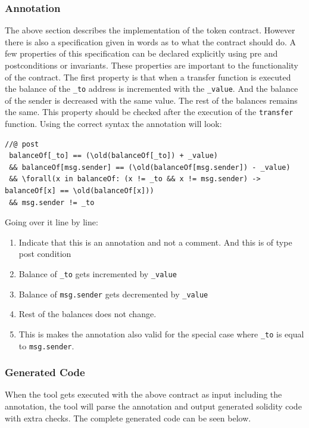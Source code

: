 \documentclass[a4paper]{article}
\begin{document}
\subsubsection{Annotation}
The above section describes the implementation of the token contract. However there is also a specification given in words as to what the contract should do. A few properties of this specification can be declared explicitly using pre and postconditions or invariants. These properties are important to the functionality of the contract. 
The first property is that when a transfer function is executed the balance of the \texttt{\_to} address is incremented with the \texttt{\_value}. And the balance of the sender is decreased with the same value. The rest of the balances remains the same. This property should be checked after the execution of the \texttt{transfer} function. Using the correct syntax the annotation will look:
\begin{lstlisting}[basicstyle=\ttfamily, breaklines=true ]
//@ post 
 balanceOf[_to] == (\old(balanceOf[_to]) + _value) 
 && balanceOf[msg.sender] == (\old(balanceOf[msg.sender]) - _value) 
 && \forall(x in balanceOf: (x != _to && x != msg.sender) -> balanceOf[x] == \old(balanceOf[x])) 
 && msg.sender != _to 
\end{lstlisting}
Going over it line by line:
\begin{enumerate}
  \item Indicate that this is an annotation and not a comment. And this is of type post condition
  \item Balance of \texttt{\_to} gets incremented by \texttt{\_value}
  \item Balance of \texttt{msg.sender} gets decremented by \texttt{\_value}
  \item Rest of the balances does not change.
  \item This is makes the annotation also valid for the special case where \texttt{\_to} is equal to \texttt{msg.sender}.
\end{enumerate}

\subsubsection{Generated Code}
When the tool gets executed with the above contract as input including the annotation, the tool will parse the annotation and output generated solidity code with extra checks. 
The complete generated code can be seen below.

\end{document}
